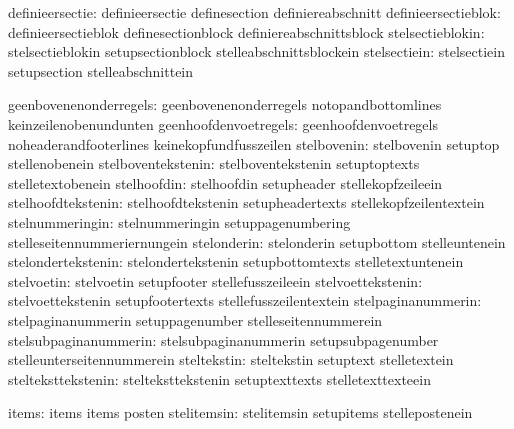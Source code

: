               definieersectie:  definieersectie              definesection
                                definiereabschnitt
          definieersectieblok:  definieersectieblok          definesectionblock
                                definiereabschnittsblock
             stelsectieblokin:  stelsectieblokin             setupsectionblock
                                stelleabschnittsblockein
                 stelsectiein:  stelsectiein                 setupsection
                                stelleabschnittein

       geenbovenenonderregels:  geenbovenenonderregels       notopandbottomlines
                                keinzeilenobenundunten
        geenhoofdenvoetregels:  geenhoofdenvoetregels        noheaderandfooterlines
                                keinekopfundfusszeilen
                  stelbovenin:  stelbovenin                  setuptop
                                stellenobenein
           stelboventekstenin:  stelboventekstenin           setuptoptexts
                                stelletextobenein
                  stelhoofdin:  stelhoofdin                  setupheader
                                stellekopfzeileein
           stelhoofdtekstenin:  stelhoofdtekstenin           setupheadertexts
                                stellekopfzeilentextein
              stelnummeringin:  stelnummeringin              setuppagenumbering
                                stelleseitennummeriernungein
                  stelonderin:  stelonderin                  setupbottom
                                stelleuntenein
           stelondertekstenin:  stelondertekstenin           setupbottomtexts
                                stelletextuntenein
                   stelvoetin:  stelvoetin                   setupfooter
                                stellefusszeileein
            stelvoettekstenin:  stelvoettekstenin            setupfootertexts
                                stellefusszeilentextein
           stelpaginanummerin:  stelpaginanummerin           setuppagenumber
                                stelleseitennummerein
        stelsubpaginanummerin:  stelsubpaginanummerin        setupsubpagenumber
                                stelleunterseitennummerein
                  steltekstin:  steltekstin                  setuptext
                                stelletextein
           stelteksttekstenin:  stelteksttekstenin           setuptexttexts
                                stelletexttexteein

                        items:  items                        items
                                posten
                  stelitemsin:  stelitemsin                  setupitems
                                stellepostenein

